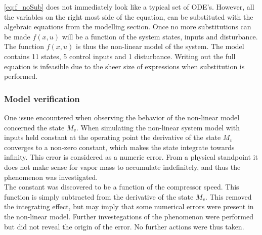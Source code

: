 \cref{eq:f_noSub} does not immediately look like a typical set of ODE's. However, all the variables on the right most side of the equation, can be substituted with the algebraic equations from the modelling section. Once no more substitutions can be made $f(x,u)$ will be a function of the system states, inputs and disturbance. The function $f(x,u)$ is thus the non-linear model of the system. The model contains 11 states, 5 control inputs and 1 disturbance. Writing out the full equation is infeasible due to the sheer size of expressions when substitution is performed.


\subsubsection{Model verification}
One issue encountered when observing the behavior of the non-linear model concerned the state $M_v$. When simulating the non-linear system model with inputs held constant at the operating point the derivative of the state $M_v$ converges to a non-zero constant, which makes the state integrate towards infinity. This error is considered as a numeric error. From a physical standpoint it does not make sense for vapor mass to accumulate indefinitely, and thus the phenomenon was investigated. \\

The constant was discovered to be a function of the compressor speed. This function is simply subtracted from the derivative of the state $M_v$. This removed the integrating effect, but may imply that some numerical errors were present in the non-linear model. Further investegations of the phenomenon were performed but did not reveal the origin of the error. No further actions were thus taken.




